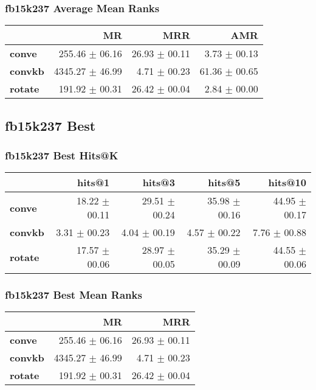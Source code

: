 \documentclass{article}
\begin{document}
\subsubsection{fb15k237 Average Mean Ranks}
    \begin{center}
    \begin{tabular}{lrrr}
\toprule
{} &               MR &            MRR &            AMR \\
\midrule
\textbf{conve } &   255.46 $\pm$ 06.16 &  26.93 $\pm$ 00.11 &   3.73 $\pm$ 00.13 \\
\textbf{convkb} &  4345.27 $\pm$ 46.99 &   4.71 $\pm$ 00.23 &  61.36 $\pm$ 00.65 \\
\textbf{rotate} &   191.92 $\pm$ 00.31 &  26.42 $\pm$ 00.04 &   2.84 $\pm$ 00.00 \\
\bottomrule
\end{tabular}

    \end{center}
\subsection{fb15k237 Best}
\subsubsection{fb15k237 Best Hits@K}
    \begin{center}
    \begin{tabular}{lrrrr}
\toprule
{} &         hits@1 &         hits@3 &         hits@5 &        hits@10 \\
\midrule
\textbf{conve } &  18.22 $\pm$ 00.11 &  29.51 $\pm$ 00.24 &  35.98 $\pm$ 00.16 &  44.95 $\pm$ 00.17 \\
\textbf{convkb} &   3.31 $\pm$ 00.23 &   4.04 $\pm$ 00.19 &   4.57 $\pm$ 00.22 &   7.76 $\pm$ 00.88 \\
\textbf{rotate} &  17.57 $\pm$ 00.06 &  28.97 $\pm$ 00.05 &  35.29 $\pm$ 00.09 &  44.55 $\pm$ 00.06 \\
\bottomrule
\end{tabular}

    \end{center}
\subsubsection{fb15k237 Best Mean Ranks}
    \begin{center}
    \begin{tabular}{lrr}
\toprule
{} &               MR &            MRR \\
\midrule
\textbf{conve } &   255.46 $\pm$ 06.16 &  26.93 $\pm$ 00.11 \\
\textbf{convkb} &  4345.27 $\pm$ 46.99 &   4.71 $\pm$ 00.23 \\
\textbf{rotate} &   191.92 $\pm$ 00.31 &  26.42 $\pm$ 00.04 \\
\bottomrule
\end{tabular}

    \end{center}
\end{document}
